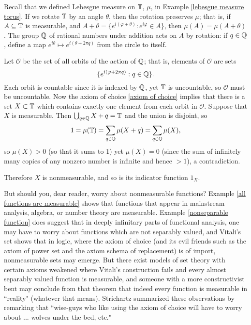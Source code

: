 \begin{example}
\label{Vitali set}
Recall that we defined Lebesgue measure on $\mathbb{T}$, $\mu$, in Example \ref{lebesgue measure torus}.
If we rotate $\mathbb{T}$ by an angle $\theta$, then the rotation preserves $\mu$; that is, if $A \subseteq \mathbb{T}$ is measurable, and $A + \theta = \{e^{i(\varphi+\theta)}: e^{i\varphi} \in A\}$, then $\mu(A) = \mu(A + \theta)$.
The group $\mathbb{Q}$ of rational numbers under addition acts on $A$ by rotation: if $q \in \mathbb{Q}$, define a map $e^{i\theta} \mapsto e^{i(\theta + 2\pi q)}$ from the circle to itself.

Let $\mathcal O$ be the set of all orbits of the action of $\mathbb{Q}$; that is, elements of $\mathcal O$ are sets
$$\{e^{i(\varphi+2\pi q)}: q \in \mathbb{Q}\}.$$
Each orbit is countable since it is indexed by $\mathbb{Q}$, yet $\mathbb{T}$ is uncountable, so $\mathcal O$ must be uncountable.
Now the axiom of choice \ref{axiom of choice} implies that there is a set $X \subset \mathbb{T}$ which contains exactly one element from each orbit in $\mathcal O$.
Suppose that $X$ is measurable. Then $\bigcup_{q \in \mathbb{Q}} X + q = \mathbb{T}$ and the union is disjoint, so
$$1 = \mu(\mathbb{T}) = \sum_{q \in \mathbb{Q}} \mu(X +  q) = \sum_{q \in \mathbb{Q}} \mu(X),$$
so $\mu(X) > 0$ (so that it sums to $1$) yet $\mu(X) = 0$ (since the sum of infinitely many copies of any nonzero number is infinite and hence $> 1$), a contradiction.

Therefore $X$ is nonmeasurable, and so is its indicator function $1_X$.
\end{example}

\begin{subsec}
But should you, dear reader, worry about nonmeasurable functions?
Example \ref{all functions are measurable} shows that functions that appear in mainstream analysis, algebra, or number theory are measurable.
Example \ref{nonseparable function} does suggest that in deeply infinitary parts of functional analysis, one may have to worry about functions which are not separably valued, and Vitali's set shows that in logic, where the axiom of choice (and its evil friends such as the axiom of power set and the axiom schema of replacement) is of import, nonmeasurable sets may emerge.
But there exist models of set theory \cite{Solovay1970} with certain axioms weakened where Vitali's construction fails and every almost separably valued function is measurable, and someone with a more constructivist bent may conclude from that theorem that indeed every function is measurable in ``reality" (whatever that means).
Strichartz \cite[Chapter 1]{strichartz2003guide} summarized these observations by remarking that ``wise-guys who like using the axiom of choice will have to worry about ... wolves under the bed, etc."
\end{subsec}

